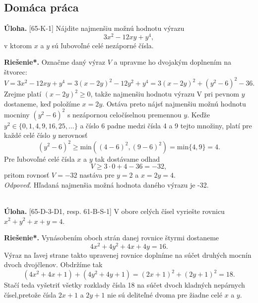 \documentclass[11pt,a4paper,oneside,final]{book}
\newcommand{\ul}{\textbf{Úloha.} }
\newcommand{\rieh}{\textbf{Riešenie*.} }
\begin{document}
\subsection*{Domáca práca}
\begin{tcolorbox}[breakable,notitle,boxrule=0pt,colback=light-gray,colframe=light-gray]\ul [65-K-1] Nájdite najmenšiu možnú hodnotu výrazu $$3x^2 - 12xy + y^4,$$
v ktorom $x$ a $y$ sú ľubovoľné celé nezáporné čísla.

\end{tcolorbox}

\rieh Označme daný výraz $V$ a upravme ho dvojakým doplnením na štvorec: $$V = 3x^2 - 12xy + y^4= 3(x - 2y)^2 - 12y^2+ y^4= 3(x - 2y)^2+ (y^2 - 6)^2 - 36.$$
Zrejme platí $(x-2y)^2\geq0$, takže najmenšiu hodnotu výrazu V pri pevnom $y$ dostaneme, keď položíme $x = 2y$. Ostáva preto nájsť najmenšiu možnú hodnotu mocniny $(y^2 - 6)^2$
s nezápornou celočíselnou premennou $y$. Keďže $y^2 \in \{0, 1, 4, 9, 16, 25, \ldots\}$ a číslo 6 padne medzi čísla 4 a 9 tejto množiny, platí pre každé celé číslo $y$ nerovnosť $$(y^2 - 6)^
2\geq \mathrm{min} ((4 - 6)^2, (9 - 6)^2) = \mathrm{min}\{4, 9\} = 4.$$ Pre ľubovoľné celé čísla $x$ a $y$ tak dostávame odhad
$$V \geq 3 \cdot 0 + 4 - 36 = -32,$$
pritom rovnosť $V = -32$ nastáva pre $y = 2$ a $x = 2y = 4$.\\
\textit{Odpoveď.} Hľadaná najmenšia možná hodnota daného výrazu je -32.\\
\\
\begin{tcolorbox}[breakable,notitle,boxrule=0pt,colback=light-gray,colframe=light-gray]\ul [65-D-3-D1, resp. 61-B-S-1] V obore celých čísel vyriešte rovnicu $x^2+ y^2+ x + y = 4$.

\end{tcolorbox}

\rieh Vynásobením oboch strán danej rovnice štyrmi dostaneme $$4x^2 + 4y^2 + 4x + 4y = 16.$$
Výraz na ľavej strane takto upravenej rovnice doplníme na súčet druhých mocnín dvoch dvojčlenov. Obdržíme tak
$$(4x^2 + 4x + 1) + (4y^2 + 4y + 1) = (2x + 1)^2 + (2y + 1)^2 = 18.$$
Stačí teda vyšetriť všetky rozklady čísla 18 na súčet dvoch kladných nepárnych čísel,pretože čísla $2x + 1$ a $2y + 1$ nie sú deliteľné dvoma pre žiadne celé $x$ a $y$.
\end{document}
